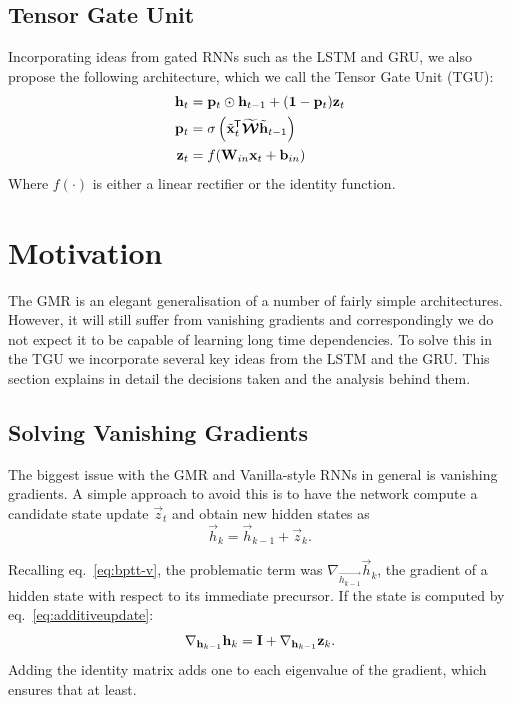 \subsection{Tensor Gate Unit}
Incorporating ideas from gated RNNs such as the LSTM and GRU, we also propose the following architecture,
which we call the Tensor Gate Unit (TGU):
\begin{align}\label{eq:tgu}
	\mathbf{h}_t &= \mathbf{p}_t \odot \mathbf{h}_{t-1} + (\mathbf{1}-\mathbf{p}_t)\mathbf{z}_t \\
	\mathbf{p}_t &= \sigma\left(\tilde{\mathbf{x}}^{\mkern-1.5mu\mathsf{T}}_t\widetilde{\bm{\mathcal{W}}}\tilde{\mathbf{h}}_{t-1} \right)\\
	\mathbf{z}_t &= f(\mathbf{W}_{in}\mathbf{x}_t + \mathbf{b}_{in})
\end{align}
Where \(f(\cdot)\) is either a linear rectifier or the identity function.

\section{Motivation}
The GMR is an elegant generalisation of a number of fairly simple architectures. However, it will
still suffer from vanishing gradients and correspondingly we do not expect it to be capable of
learning long time dependencies. To solve this in the TGU we incorporate several
key ideas from the LSTM and the GRU. This section explains in detail the decisions taken and
the analysis behind them.

\subsection{Solving Vanishing Gradients}\label{sec:additive}
The biggest issue with the GMR and Vanilla-style RNNs in general is vanishing gradients.
A simple approach to avoid this
 is to have the network compute a candidate state update
\(\vec{z}_t\) and obtain new hidden states as
\begin{equation}\label{eq:additiveupdate}
	\vec{h}_k = \vec{h}_{k-1} + \vec{z}_k.
\end{equation}

Recalling eq.~\eqref{eq:bptt-v}, the problematic term was \(\nabla_{\vec{h_{k-1}}}\vec{h}_k\),
the gradient of a hidden state with respect to its immediate precursor. If the state is computed by
eq.~\eqref{eq:additiveupdate}:
\begin{equation}\label{eq:additivegrad}
	\nabla_{\mathbf{h}_{k-1}}\mathbf{h}_k = \mathbf{I} + \nabla_{\mathbf{h}_{k-1}}\mathbf{z}_k.
\end{equation} Adding the identity matrix adds one to each eigenvalue of the gradient, which ensures
that at least.

